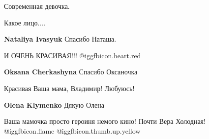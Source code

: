  
 
 
 
 

Современная девочка.

Какое лицо....

\textbf{Nataliya Ivasyuk} Спасибо Наташа.

И ОЧЕНЬ КРАСИВАЯ!!! @igg{fbicon.heart.red}

\textbf{Oksana Cherkashyna} Спасибо Оксаночка

Красивая Ваша мама, Владимир! Любуюсь!

\textbf{Olena Klymenko} Дякую Олена


Ваша мамочка просто героиня немого кино! Почти Вера Холодная!
@igg{fbicon.flame}   @igg{fbicon.thumb.up.yellow} 
